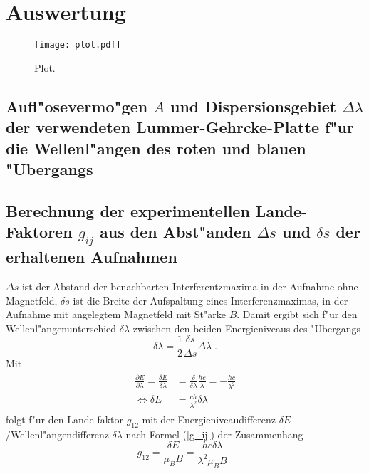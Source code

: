 \section{Auswertung}
\label{sec:Auswertung}

\begin{figure}
  \centering
  \texttt{[image: plot.pdf]}
  \caption{Plot.}
  \label{fig:plot}
\end{figure}


  \subsection{\texorpdfstring{Aufl"osevermo"gen $A$ und Dispersionsgebiet $\Delta \lambda$ der verwendeten Lummer-Gehrcke-Platte f"ur die Wellenl"angen des roten und blauen "Ubergangs}{Aufl"osevermo"gen A und Dispersionsgebiet Delta lambda der verwendeten Lummer-Gehrcke-Platte f"ur die Wellenl"angen des roten und blauen "Ubergangs}}

  \subsection{\texorpdfstring{Berechnung der experimentellen Lande-Faktoren $g_{ij}$ aus den Abst"anden $\Delta s$ und $\delta s$ der erhaltenen Aufnahmen}{Berechnung der experimentellen Lande-Faktoren g_{ij} aus den Abst"anden Delta s und delta s der erhaltenen Aufnahmen}}

  $\Delta s$ ist der Abstand der benachbarten Interferentzmaxima in der Aufnahme ohne Magnetfeld, $\delta s$ ist die Breite der Aufspaltung eines Interferenzmaximas, in der Aufnahme mit angelegtem Magnetfeld mit St"arke $B$.
  Damit ergibt sich f"ur den Wellenl"angenunterschied $\delta \lambda$ zwischen den beiden Energieniveaus des "Ubergangs
  \begin{equation}
    \delta \lambda = \frac{1}{2}\frac{\delta s}{\Delta s} \Delta \lambda \; .
  \end{equation}
  Mit
  \begin{align}
    \begin{split}
    \frac{\partial E}{\partial \lambda} = \frac{\delta E}{\delta \lambda} &= \frac{\delta}{\delta \lambda} \frac{hc}{\lambda} = -\frac{hc}{\lambda^2}\\
    \iff \delta E &= \frac{ch}{\lambda^2} \delta \lambda
   \end{split}
  \end{align}
  folgt f"ur den Lande-faktor $g_{12}$ mit der Energieniveaudifferenz $\delta E$/Wellenl"angendifferenz $\delta \lambda$ nach Formel (\ref{g_ij}) der Zusammenhang
  \begin{equation}
    g_{12}=\frac{\delta E}{\mu_BB}=\frac{hc\delta \lambda}{\lambda^2\mu_BB} \; .
  \end{equation}



